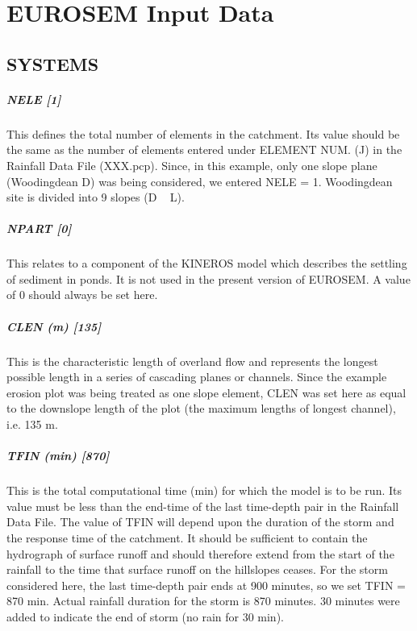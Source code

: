 \chapter{EUROSEM Input Data}
\label{sec:EUROSEMInputData}

\section{SYSTEMS}
\label{sec:SYSTEMS}

\footnotesize

\paragraph{NELE [1]}
This defines the total number of elements in the catchment. Its value should be
the same as the number of elements entered under ELEMENT NUM. (J) in the
Rainfall Data File (XXX.pcp). Since, in this example, only one slope plane
(Woodingdean D) was being considered, we entered NELE = 1. Woodingdean site is
divided into 9 slopes (D ~ L).
 
\paragraph{NPART [0]}
This relates to a component of the KINEROS model which describes the settling
of sediment in ponds. It is not used in the present version of EUROSEM. A value
of 0 should always be set here.
 
\paragraph{CLEN (m) [135]}
This is the characteristic length of overland flow and represents the longest
possible length in a series of cascading planes or channels. Since the example
erosion plot was being treated as one slope element, CLEN was set here as equal
to the downslope length of the plot (the maximum lengths of longest channel),
i.e. 135 m.
 
\paragraph{TFIN (min) [870]}
This is the total computational time (min) for which the model is to be run.
Its value must be less than the end-time of the last time-depth pair in the
Rainfall Data File. The value of TFIN will depend upon the duration of the storm
and the response time of the catchment. It should be sufficient to contain the
hydrograph of surface runoff and should therefore extend from the start of the
rainfall to the time that surface runoff on the hillslopes ceases. For the storm
considered here, the last time-depth pair ends at 900 minutes, so we set TFIN =
870 min. Actual rainfall duration for the storm is 870 minutes. 30 minutes were
added to indicate the end of storm (no rain for 30 min).
 
